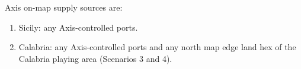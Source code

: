 \subsubsection{}
Axis on-map supply sources are:
\begin{enumerate}[label=\alph*.]
    \item Sicily: any Axis-controlled ports.
    \item Calabria: any Axis-controlled ports and any north map edge land hex of the Calabria playing area (Scenarios 3 and 4).
\end{enumerate}

\subsubsection{}
